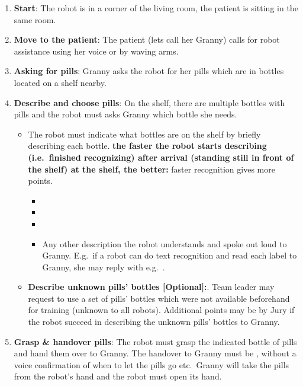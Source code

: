 \begin{enumerate}
	\item \textbf{Start}: The robot is in a corner of the living room, the patient is sitting in the same room. 

	\item \textbf{Move to the patient}: The patient (lets call her Granny) calls for robot assistance using her voice or by waving arms.

	\item \textbf{Asking for pills}: Granny asks the robot for her pills which are in bottles located on a shelf nearby. 

	\item \textbf{Describe and choose pills}: On the shelf, there are multiple bottles with pills and the robot must asks Granny which bottle she needs.
	\begin{itemize}
		\item The robot must indicate what bottles are on the shelf by briefly describing each bottle.
		\textbf{the faster the robot starts describing (i.e.~finished recognizing) after arrival (standing still in front of the shelf) at the shelf, the better:} faster recognition gives more points. 
		\begin{itemize}
 			\item {}
  			\item {}
  			\item {}
  			\item Any other description the robot understands and spoke out loud to Granny. E.g.~if a robot can do text recognition and read each label to Granny, she may reply with e.g.~.
 		\end{itemize}
		\item \textbf{Describe unknown pills' bottles [Optional]:}. Team leader may request to use a set of pills' bottles which were not available beforehand for training (unknown to all robots). Additional points may be by Jury if the robot succeed in describing the unknown pills' bottles to Granny.
 	\end{itemize}

 	\item \textbf{Grasp \& handover pills}: The robot must grasp the indicated bottle of pills and hand them over to Granny. The handover to Granny must be , without a voice confirmation of when to let the pills go etc.~Granny will take the pills from the robot's hand and the robot must open its hand.


\end{enumerate}
